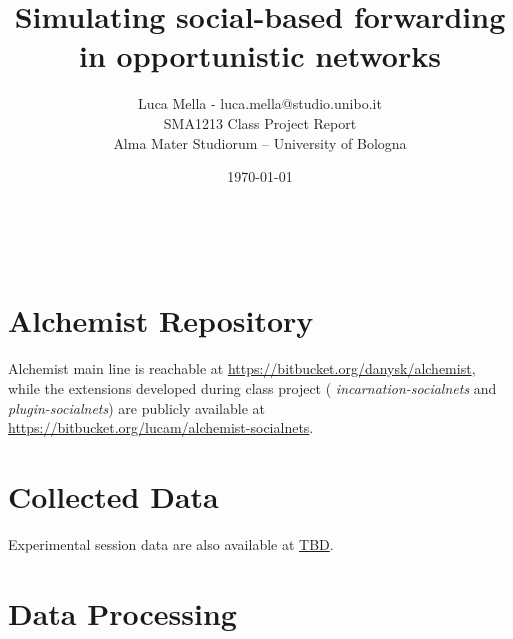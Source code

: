 \documentclass[a4paper]{article}
\begin{document}
\title{Simulating social-based forwarding in opportunistic networks}
\author{Luca Mella - luca.mella@studio.unibo.it \\ SMA1213 Class Project Report \\ Alma Mater Studiorum -- University of Bologna \\ }
\date{\today}

\maketitle


\sloppy



\newpage

\
\newpage


\newpage


\newpage


\newpage


\newpage
\nocite{*}
{}
 

\newpage
\appendix
\appendixpage 
\section{Alchemist Repository}
Alchemist main line is reachable at \url{https://bitbucket.org/danysk/alchemist}, while the extensions developed during class project ( \emph{incarnation-socialnets} and \emph{plugin-socialnets}) are publicly available at \url{https://bitbucket.org/lucam/alchemist-socialnets}.
\section{Collected Data}
Experimental session data are also available at \url{TBD}. 
\section{Data Processing}

\end{document}
